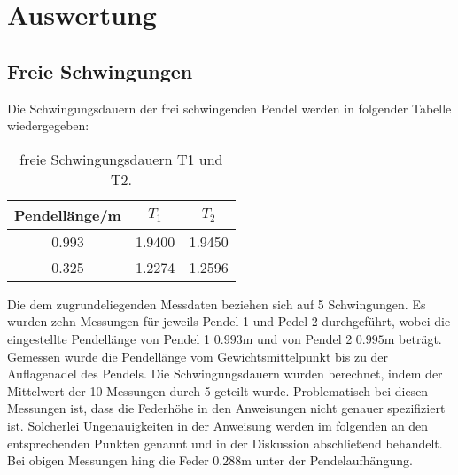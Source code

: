 \section{Auswertung}
  \subsection{Freie Schwingungen}
    Die Schwingungsdauern der frei schwingenden Pendel werden in folgender Tabelle wiedergegeben:
      \begin{table}
        \centering
          \caption{freie Schwingungsdauern T1 und T2.}
          \label{tab:aufgabe1}
          \begin{tabular}{S S S}
            \toprule
            {Pendellänge/m}  & {$T_{1}$} & {$T_{2}$} \\
                        &   1.9400  &   1.9450 \\
            0.325            &   1.2274  &   1.2596 \\
            \bottomrule
          \end{tabular}
        \end{table}
    Die dem zugrundeliegenden Messdaten beziehen sich auf 5 Schwingungen. Es wurden zehn Messungen für jeweils Pendel 1
    und Pedel 2 durchgeführt, wobei die eingestellte Pendellänge von Pendel 1 $0.993$m und von Pendel 2 $0.995$m beträgt.
    Gemessen wurde die Pendellänge vom Gewichtsmittelpunkt bis zu der Auflagenadel des Pendels. Die  Schwingungsdauern
    wurden berechnet, indem der Mittelwert der 10 Messungen durch 5 geteilt wurde.
    Problematisch bei diesen Messungen ist, dass die Federhöhe in den Anweisungen nicht genauer spezifiziert ist.
    Solcherlei Ungenauigkeiten in der Anweisung werden im folgenden an den entsprechenden Punkten genannt und in der
    Diskussion abschließend behandelt. Bei obigen Messungen hing die Feder $0.288$m unter der Pendelaufhängung.
